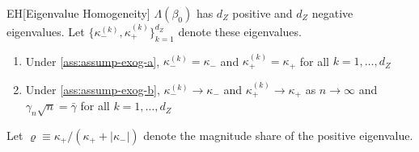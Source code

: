 \begin{lemmap}{EH}[Eigenvalue Homogeneity]\label{lem:bnh}
\(\Lambda(\beta_0)\) has \(d_Z\) positive and \(d_Z\) negative eigenvalues.
Let \(\{\kappa^{(k)}_-,\kappa^{(k)}_+\}_{k=1}^{d_Z}\) denote these eigenvalues.
    \begin{enumerate}
        \item
        Under \ref{ass:assump-exog-a}, \(\kappa^{(k)}_-=\kappa_-\) and  \(\kappa^{(k)}_+=\kappa_+\) for all \(k=1,\ldots,d_Z\)
        \item
        Under \ref{ass:assump-exog-b},
        \(\kappa^{(k)}_-\to\kappa_-\) and  \(\kappa^{(k)}_+\to\kappa_+\) as \(n\to\infty\) and \(\gamma_n\sqrt{n}=\bar \gamma\) for all \(k=1,\ldots,d_Z\)
    \end{enumerate}
    Let \(\varrho \equiv  \kappa_+ / (\kappa_++\lvert\kappa_-\rvert)\) denote the magnitude share of the positive eigenvalue.
\end{lemmap}
